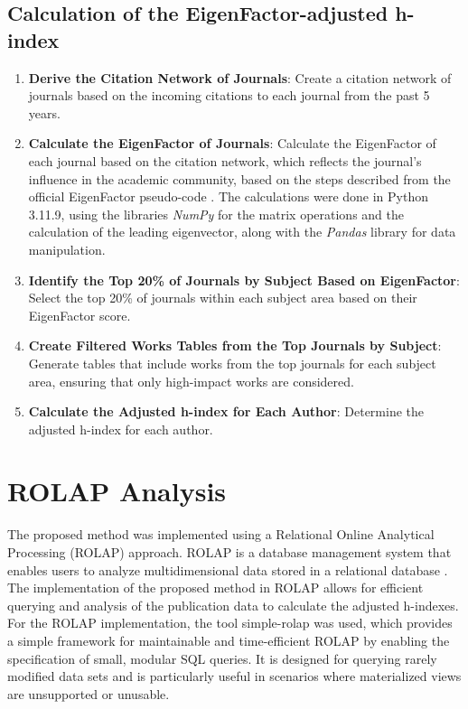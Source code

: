 \subsection{Calculation of the EigenFactor-adjusted h-index}
\begin{enumerate}
      \item \textbf{Derive the Citation Network of Journals}: Create a citation network of journals based on the
            incoming citations to each journal from the past 5 years.
      \item \textbf{Calculate the EigenFactor of Journals}: Calculate the EigenFactor of each journal based on the
            citation network, which reflects the journal's influence in the academic community, based on the steps
            described from the official EigenFactor pseudo-code \cite{west2008pseudocode}. The calculations were done  in Python
            3.11.9, using the libraries \emph{NumPy} for the matrix operations and the
            calculation of the leading eigenvector, along with the \emph{Pandas} library
            for data manipulation.
      \item \textbf{Identify the Top 20\% of Journals by Subject Based on EigenFactor}: Select the top 20\% of journals within
            each subject area based on their EigenFactor score\@.

      \item \textbf{Create Filtered Works Tables from the Top Journals by Subject}: Generate tables that include works from
            the top journals for each subject area, ensuring that only high-impact works are considered.

      \item \textbf{Calculate the Adjusted h-index for Each Author}: Determine the adjusted h-index for each author.
\end{enumerate}

\section{ROLAP Analysis}

The proposed method was implemented using a Relational Online Analytical
Processing (ROLAP) approach. ROLAP is a database management system that enables
users to analyze multidimensional data stored in a relational database
\cite{codd1993providing}. The implementation of the proposed method in ROLAP
allows for efficient querying and analysis of the publication data to calculate
the adjusted h-indexes. For the ROLAP implementation,
the tool simple-rolap \cite{simple-rolap} was used, which provides a simple
framework for maintainable and time-efficient ROLAP 
by enabling the specification of small, modular SQL queries.
It is designed for querying rarely modified data sets and is particularly
useful in scenarios where materialized views are unsupported or unusable.

